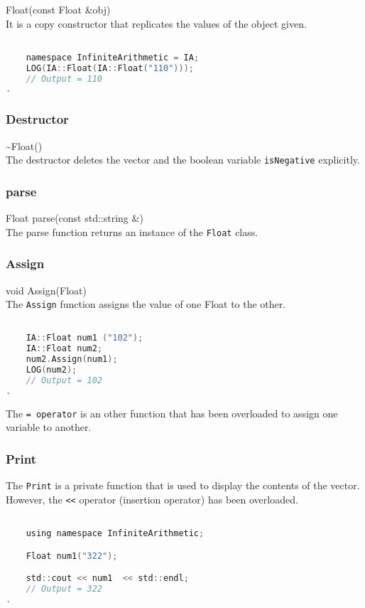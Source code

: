 \noindent
{\ttfamily \large Float(const Float \&obj)} \\[2mm]
It is a copy constructor that replicates the values of the object given.
\vspace*{1em}
\begin{lstlisting}[language = C]

	namespace InfiniteArithmetic = IA;
	LOG(IA::Float(IA::Float("110")));
	// Output = 110
.
\end{lstlisting}
\vspace*{1em}


\subsubsection{Destructor}  \vspace*{0.5em}

{\ttfamily \large \~{}Float()} \\[2mm]
The destructor deletes the vector and the boolean variable \verb|isNegative| explicitly.


\subsubsection{parse} 

{\ttfamily \large Float parse(const std::string \&)} \\[2mm]
The parse function returns an instance of the \verb|Float| class.

\subsubsection{Assign}  
{\ttfamily \large void Assign(Float)} \\[2mm]
The \verb|Assign| function assigns the value of one Float to the other.
\vspace*{1em}
\begin{lstlisting}[language = C]	

	IA::Float num1 ("102");
	IA::Float num2;
	num2.Assign(num1);
	LOG(num2);
	// Output = 102
.
\end{lstlisting}
\vspace*{1em}

The \verb|= operator| is an other function that has been overloaded to assign one variable to another.


\subsubsection{Print}
The \verb|Print| is a private function that is used to display the contents of the vector. \\
However, the \verb|<<| operator (insertion operator) has been overloaded.
\vspace*{1em}
\begin{lstlisting}[language = C]

	using namespace InfiniteArithmetic;

	Float num1("322");

	std::cout << num1  << std::endl; 
	// Output = 322
.
\end{lstlisting}
\vspace*{1em}

